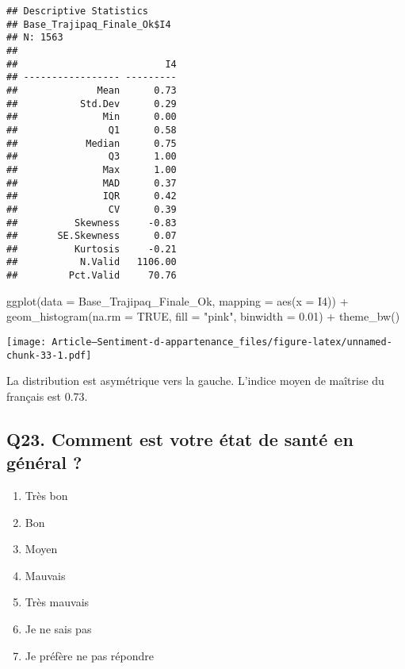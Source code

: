 \documentclass[
]{article}
\newenvironment{Shaded}{\begin{snugshade}}{\end{snugshade}}
\newcommand{\AttributeTok}[1]{\textcolor[rgb]{0.77,0.63,0.00}{#1}}
\newcommand{\ConstantTok}[1]{\textcolor[rgb]{0.00,0.00,0.00}{#1}}
\newcommand{\FloatTok}[1]{\textcolor[rgb]{0.00,0.00,0.81}{#1}}
\newcommand{\FunctionTok}[1]{\textcolor[rgb]{0.00,0.00,0.00}{#1}}
\newcommand{\NormalTok}[1]{#1}
\newcommand{\SpecialCharTok}[1]{\textcolor[rgb]{0.00,0.00,0.00}{#1}}
\newcommand{\StringTok}[1]{\textcolor[rgb]{0.31,0.60,0.02}{#1}}
\providecommand{\tightlist}{%
  \setlength{\itemsep}{0pt}\setlength{\parskip}{0pt}}
\begin{document}
\begin{verbatim}
## Descriptive Statistics  
## Base_Trajipaq_Finale_Ok$I4  
## N: 1563  
## 
##                          I4
## ----------------- ---------
##              Mean      0.73
##           Std.Dev      0.29
##               Min      0.00
##                Q1      0.58
##            Median      0.75
##                Q3      1.00
##               Max      1.00
##               MAD      0.37
##               IQR      0.42
##                CV      0.39
##          Skewness     -0.83
##       SE.Skewness      0.07
##          Kurtosis     -0.21
##           N.Valid   1106.00
##         Pct.Valid     70.76
\end{verbatim}

\begin{Shaded}
\begin{Highlighting}[]
\FunctionTok{ggplot}\NormalTok{(}\AttributeTok{data =}\NormalTok{ Base\_Trajipaq\_Finale\_Ok, }\AttributeTok{mapping =} \FunctionTok{aes}\NormalTok{(}\AttributeTok{x =}\NormalTok{ I4)) }\SpecialCharTok{+}
  \FunctionTok{geom\_histogram}\NormalTok{(}\AttributeTok{na.rm =} \ConstantTok{TRUE}\NormalTok{, }\AttributeTok{fill =} \StringTok{"pink"}\NormalTok{, }\AttributeTok{binwidth =} \FloatTok{0.01}\NormalTok{) }\SpecialCharTok{+}
  \FunctionTok{theme\_bw}\NormalTok{()}
\end{Highlighting}
\end{Shaded}

\texttt{[image: Article---Sentiment-d-appartenance\_files/figure-latex/unnamed-chunk-33-1.pdf]}

La distribution est asymétrique vers la gauche. L'indice moyen de
maîtrise du français est 0.73.

\hypertarget{q23.-comment-est-votre-uxe9tat-de-santuxe9-en-guxe9nuxe9ral}{%
\subsection{Q23. Comment est votre état de santé en général
?}\label{q23.-comment-est-votre-uxe9tat-de-santuxe9-en-guxe9nuxe9ral}}

\begin{enumerate}
\def\labelenumi{\arabic{enumi}.}
\tightlist
\item
  Très bon
\item
  Bon
\item
  Moyen
\item
  Mauvais
\item
  Très mauvais
\item
  Je ne sais pas
\item
  Je préfère ne pas répondre
\end{enumerate}
\end{document}

